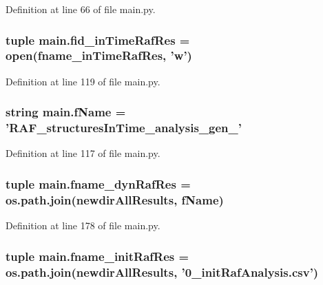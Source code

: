 Definition at line 66 of file main.\-py.

\hypertarget{a00122_ab82095abcedb97b7abf8e003f4724d0c}{
\subsubsection[{fid\-\_\-in\-Time\-Raf\-Res}]{\setlength{\rightskip}{0pt plus 5cm}tuple main.\-fid\-\_\-in\-Time\-Raf\-Res = open({\bf fname\-\_\-in\-Time\-Raf\-Res}, 'w')}}\label{a00122_ab82095abcedb97b7abf8e003f4724d0c}


Definition at line 119 of file main.\-py.

\hypertarget{a00122_a9fff4b23f9489649601960dabc4a6cdd}{
\subsubsection[{f\-Name}]{\setlength{\rightskip}{0pt plus 5cm}string main.\-f\-Name = 'R\-A\-F\-\_\-structures\-In\-Time\-\_\-analysis\-\_\-gen\-\_\-'}}\label{a00122_a9fff4b23f9489649601960dabc4a6cdd}


Definition at line 117 of file main.\-py.

\hypertarget{a00122_a6a031fb0c5a0a5519fc4c3f6d7ef35d1}{
\subsubsection[{fname\-\_\-dyn\-Raf\-Res}]{\setlength{\rightskip}{0pt plus 5cm}tuple main.\-fname\-\_\-dyn\-Raf\-Res = os.\-path.\-join({\bf newdir\-All\-Results}, {\bf f\-Name})}}\label{a00122_a6a031fb0c5a0a5519fc4c3f6d7ef35d1}


Definition at line 178 of file main.\-py.

\hypertarget{a00122_a72ed3f9434cc4dcc2240c6ca408960ff}{
\subsubsection[{fname\-\_\-init\-Raf\-Res}]{\setlength{\rightskip}{0pt plus 5cm}tuple main.\-fname\-\_\-init\-Raf\-Res = os.\-path.\-join({\bf newdir\-All\-Results}, '0\-\_\-init\-Raf\-Analysis.\-csv')}}\label{a00122_a72ed3f9434cc4dcc2240c6ca408960ff}


